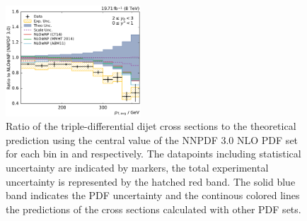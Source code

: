 \begin{figure}[htbp]
    \includegraphics[width=0.45\textwidth]{figures/measurement/ratio_to_NNPDF30+np_totcomp_yb2ys0.pdf}
    \caption[Ratio of the cross section to NNPDF 3.0 NLO]{
    Ratio of the triple-differential dijet cross sections to the theoretical
    prediction using the central value of the NNPDF 3.0 NLO PDF set for each bin in \ystar
    and \yboost respectively. The datapoints including statistical uncertainty are
    indicated by markers, the total experimental uncertainty is represented by the
    hatched red band. The solid blue band indicates the PDF uncertainty and the
    continous colored lines the predictions of the cross sections calculated with
    other PDF sets.}
    \label{fig:ratio_nnpdf30_nlo}
\end{figure}

